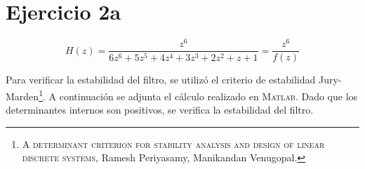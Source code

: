\documentclass[../../guia1.tex]{subfiles}
\begin{document}
\section*{Ejercicio 2a}

\[H(z) = \frac{z^6}{6z^6+5z^5+4z^4+3z^3+2z^2+z+1} = \frac{z^6}{f(z)}\]

Para verificar la estabilidad del filtro, se utiliz\'o el criterio de estabilidad Jury-Marden\footnote{\textsc{A determinant criterion for stability analysis and design of linear discrete systems}, Ramesh Periyasamy, Manikandan Venugopal. }. A continuaci\'on se adjunta el c\'alculo realizado en \textsc{Matlab}. Dado que los determinantes internos son positivos, se verifica la estabilidad del filtro.




\end{document}
